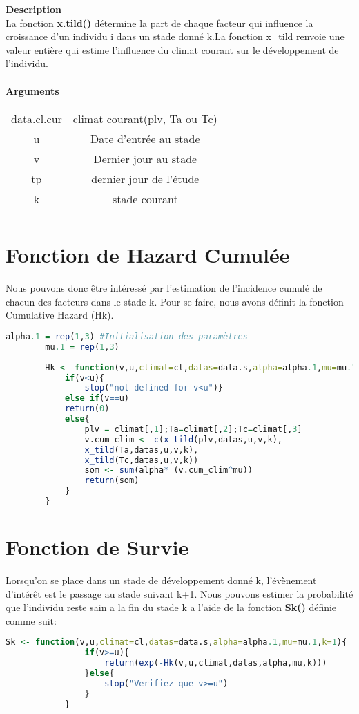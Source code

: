 \documentclass[12pt,a4paper]{scrbook}
\begin{document}
		\textbf{Description} \\
La fonction \textbf{x.tild()} détermine la part de chaque facteur qui influence la croissance d'un individu i dans un stade donné k.La fonction x\_tild renvoie une valeur entière qui estime l'influence du climat courant sur le développement de l'individu.\\
		\\
		\textbf{Arguments}\\
		\begin{tabular}{cc}
			data.cl.cur  & climat courant(plv, Ta ou Tc)\\
			u & Date d'entrée au stade \\
			v & Dernier jour au stade \\
			tp & dernier jour de l'étude \\
			k & stade courant \\
			\\
		\end{tabular} 
		
		\section{Fonction de Hazard Cumulée}
Nous pouvons donc être intéressé par l'estimation de l'incidence cumulé de chacun des facteurs dans le stade k. Pour se faire, nous avons définit la fonction Cumulative Hazard (Hk).
		\begin{lstlisting}[language=R]
		alpha.1 = rep(1,3) #Initialisation des paramètres 
		mu.1 = rep(1,3)
		
		Hk <- function(v,u,climat=cl,datas=data.s,alpha=alpha.1,mu=mu.1,k=1){
			if(v<u){
				stop("not defined for v<u")}
			else if(v==u)
			return(0)
			else{
				plv = climat[,1];Ta=climat[,2];Tc=climat[,3]
				v.cum_clim <- c(x_tild(plv,datas,u,v,k),
				x_tild(Ta,datas,u,v,k),
				x_tild(Tc,datas,u,v,k))
				som <- sum(alpha* (v.cum_clim^mu))
				return(som)
			}
		}
		\end{lstlisting}
		\section{Fonction de Survie}
Lorsqu'on se place dans un stade de développement donné k, l'évènement d'intérêt est le passage au stade suivant k+1. Nous pouvons estimer la probabilité que l'individu reste sain a la fin du stade k a l'aide de la fonction \textbf{Sk()} définie comme suit:\\
		\begin{lstlisting}[language=R]
			Sk <- function(v,u,climat=cl,datas=data.s,alpha=alpha.1,mu=mu.1,k=1){
				if(v>=u){
					return(exp(-Hk(v,u,climat,datas,alpha,mu,k)))
				}else{
					stop("Verifiez que v>=u")
				}
			}
		\end{lstlisting}
\end{document}

